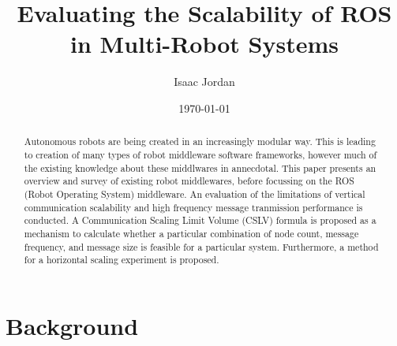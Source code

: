 \documentclass{l4proj}
\begin{document}
\title{Evaluating the Scalability of ROS in Multi-Robot Systems}
\author{Isaac Jordan}
\date{\today}
\maketitle

\begin{abstract}
Autonomous robots are being created in an increasingly modular way. This is leading to creation of many types of robot middleware software frameworks, however much of the existing knowledge about these middlwares in annecdotal. This paper presents an overview and survey of existing robot middlewares, before focussing on the ROS (Robot Operating System) middleware. An evaluation of the limitations of vertical communication scalability and high frequency message tranmission performance is conducted. A Communication Scaling Limit Volume (CSLV) formula is proposed as a mechanism to calculate whether a particular combination of node count, message frequency, and message size is feasible for a particular system. Furthermore, a method for a horizontal scaling experiment is proposed.
\end{abstract}

\educationalconsent
%
%
\tableofcontents

\pagebreak
{}




\chapter{Background}
\label{background-chapter}






\end{document}
